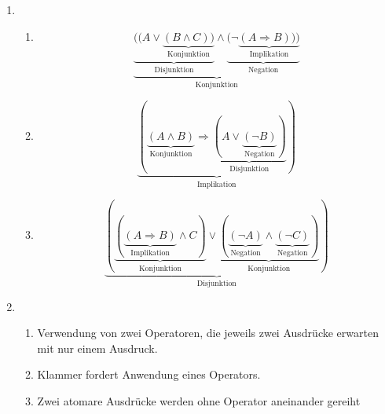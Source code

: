 \documentclass[a4paper]{article}
\begin{document}
	\begin{enumerate}
	
		\item
		\begin{enumerate}
			\item
			\begin{equation*}
				\underbrace{\underbrace{((A \lor \underbrace{(B \land C))}_{\text{Konjunktion}}}_{\text{Disjunktion}} \land \underbrace{( \lnot \underbrace{(A \Rightarrow B)))}_{\text{Implikation}}}_{\text{Negation}}}_{\text{Konjunktion}}
			\end{equation*}
			
			\item
			\begin{equation*}
				\underbrace{(\underbrace{(A \land B)}_{\text{Konjunktion}}\Rightarrow \underbrace{(A \lor \underbrace{(\lnot B)}_{\text{Negation}})}_{\text{Disjunktion}})}_{\text{Implikation}}
			\end{equation*}
			
			\item
			\begin{equation*}
				\underbrace{(\underbrace{(\underbrace{(A \Rightarrow B)}_{\text{Implikation}} \land C)}_{\text{Konjunktion}} \lor \underbrace{(\underbrace{(\lnot A)}_{\text{Negation}} \land \underbrace{(\lnot C)}_{\text{Negation}} )}_{\text{Konjunktion}})}_{\text{Disjunktion}}
			\end{equation*}
		\end{enumerate}
		
		\item
		\begin{enumerate}
			\item Verwendung von zwei Operatoren, die jeweils zwei Ausdrücke erwarten mit nur einem Ausdruck.
			\item Klammer fordert Anwendung eines Operators.
			\item Zwei atomare Ausdrücke werden ohne Operator aneinander gereiht
		\end{enumerate}
		

\end{enumerate}
\end{document}
